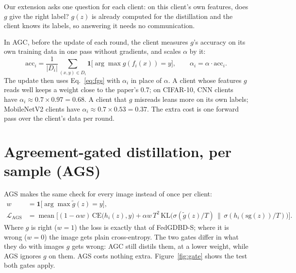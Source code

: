 Our extension asks one question for each client: on this client's own features, does $g$ give the right label? $g(z)$ is already computed for the distillation and the client knows its labels, so answering it needs no communication.

In AGC, before the update of each round, the client measures $g$'s accuracy on its own training data in one pass without gradients, and scales $\alpha$ by it:
\begin{equation}
\mathrm{acc}_i = \frac{1}{|D_i|} \sum_{(x,y) \in D_i} \mathbf{1}\big[\arg\max g(f_i(x)) = y\big], \qquad \alpha_i = \alpha \cdot \mathrm{acc}_i .
\label{eq:agc}
\end{equation}
The update then uses Eq.~\eqref{eq:fgs} with $\alpha_i$ in place of $\alpha$. A client whose features $g$ reads well keeps a weight close to the paper's 0.7; on CIFAR-10, CNN clients have $\alpha_i \approx 0.7 \times 0.97 = 0.68$. A client that $g$ misreads leans more on its own labels; MobileNetV2 clients have $\alpha_i \approx 0.7 \times 0.53 = 0.37$. The extra cost is one forward pass over the client's data per round.

\section{Agreement-gated distillation, per sample (AGS)}
\label{sec:m-ags}

AGS makes the same check for every image instead of once per client:
\begin{equation}
\begin{aligned}
w &= \mathbf{1}\big[\arg\max \tilde{g}(z) = y\big],\\
\mathcal{L}_{\text{AGS}} &= \operatorname{mean}\Big[(1-\alpha w)\,\mathrm{CE}\big(h_i(z), y\big) + \alpha w\, T^2\, \mathrm{KL}\big(\sigma(\tilde{g}(z)/T) \,\big\|\, \sigma(h_i(\mathrm{sg}(z))/T)\big)\Big].
\end{aligned}
\label{eq:ags}
\end{equation}
Where $g$ is right ($w=1$) the loss is exactly that of FedGDBD-S; where it is wrong ($w=0$) the image gets plain cross-entropy. The two gates differ in what they do with images $g$ gets wrong: AGC still distils them, at a lower weight, while AGS ignores $g$ on them. AGS costs nothing extra. Figure~\ref{fig:gate} shows the test both gates apply.

